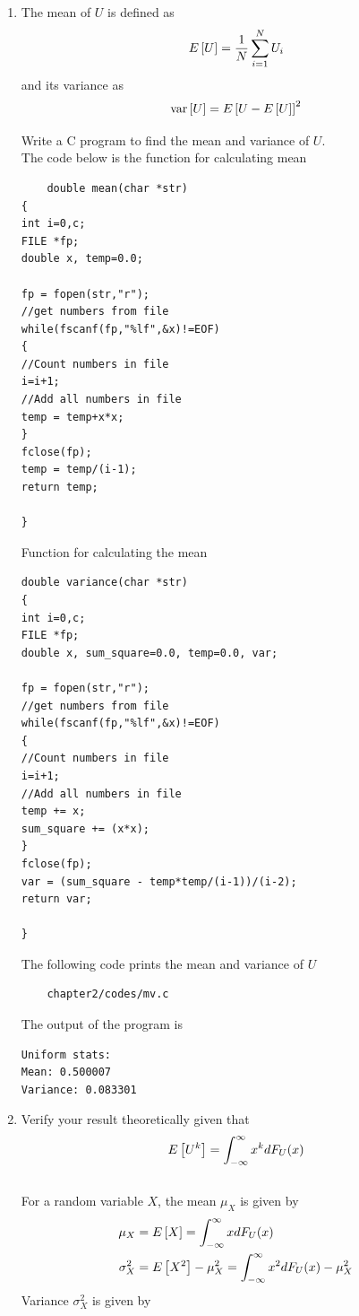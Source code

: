 \begin{enumerate}
\item
\label{prob:print_uni}
The mean of $U$ is defined as
%
\begin{equation}
E{}\left[U\right] = \frac{1}{N}\sum_{i=1}^{N}U_i
\end{equation}
%
and its variance as
%
\begin{equation}
\text{var}{}\left[U\right] = E{}\left[U- E{}\left[U\right]\right]^2 
\end{equation}

Write a C program to  find the mean and variance of $U$.\\
\solution The code below is the function for calculating mean
\begin{lstlisting}
	double mean(char *str)
{
int i=0,c;
FILE *fp;
double x, temp=0.0;

fp = fopen(str,"r");
//get numbers from file
while(fscanf(fp,"%lf",&x)!=EOF)
{
//Count numbers in file
i=i+1;
//Add all numbers in file
temp = temp+x*x;
}
fclose(fp);
temp = temp/(i-1);
return temp;

}
\end{lstlisting}
Function for calculating the mean
\begin{lstlisting}
double variance(char *str)
{
int i=0,c;
FILE *fp;
double x, sum_square=0.0, temp=0.0, var;

fp = fopen(str,"r");
//get numbers from file
while(fscanf(fp,"%lf",&x)!=EOF)
{
//Count numbers in file
i=i+1;
//Add all numbers in file
temp += x;
sum_square += (x*x);
}
fclose(fp);
var = (sum_square - temp*temp/(i-1))/(i-2);
return var;

}
\end{lstlisting}
The following code prints the mean and variance of $U$
\begin{lstlisting}
	chapter2/codes/mv.c
\end{lstlisting}
The output of the program is
\begin{lstlisting}
Uniform stats:
Mean: 0.500007
Variance: 0.083301
\end{lstlisting}

\item Verify your result theoretically given that
%
\begin{equation}
E{}\left[U^k\right] = \int_{-\infty}^{\infty}x^kdF_{U}(x)
\end{equation}\\
\solution For a random variable $X$, the mean $\mu_X$ is given by
\begin{align}
	\label{eq:mean_exp}
	\mu_X &= E{}\left[X\right] = \int_{-\infty}^{\infty}xdF_{U}(x) \\
	\label{eq:var_exp}
	\sigma_X^2 &= E{}\left[X^2\right] - \mu_X^2 = \int_{-\infty}^{\infty}x^2dF_{U}(x) - \mu_X^2
\end{align} 
Variance $\sigma_X^2$ is given by
 

\end{enumerate}
